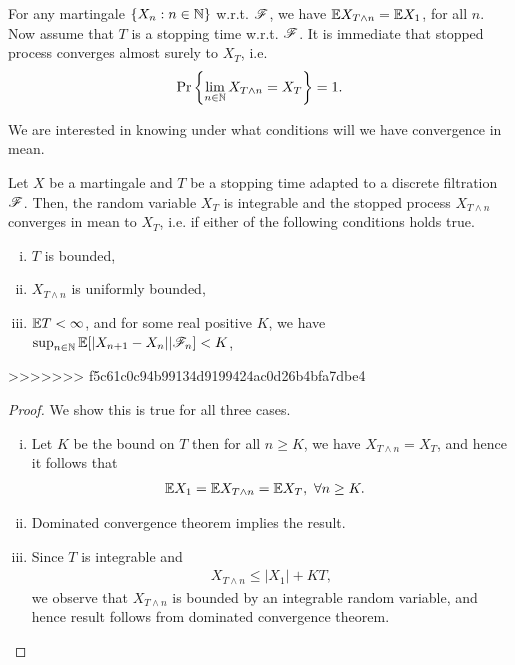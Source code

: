 \documentclass[a4paper,10pt,english]{article}
\begin{document}
\begin{thm}
\begin{rem}
For any martingale $\{X_n: n \in \mathbb{N}\}$ w.r.t. $\mathscr{F}$, we have $\mathbb{E} X_{T\wedge n} =\mathbb{E} X_1$, for all $n$.  
Now assume that $T$ is a stopping time w.r.t. $\mathscr{F}$. 
It is immediate that stopped process converges almost surely to $X_T$, i.e. 
\begin{align*}
\Pr\left\{\lim_{n\in \mathbb{N}}{X}_{T\wedge n} = X_T\right\} = 1.
\end{align*}
\end{rem}
We are interested in knowing under what conditions will we have convergence in mean. %
\begin{thm}
\label{MartStopThm}
Let $X$ be a martingale and $T$ be a stopping time adapted to a discrete filtration $\mathscr{F}$. 
Then, the random variable $X_T$ is integrable and the stopped process $X_{T \wedge n}$ converges in mean to $X_T$, i.e.
if 
either of the following conditions holds true. 
\begin{enumerate}[(i)]
\item $T$ is bounded, 
\item $X_{T\wedge n}$ is uniformly bounded,
\item $\mathbb{E} T < \infty$, and for some real positive $K$, we have $\sup_{n \in \mathbb{N}}\mathbb{E}[|X_{n+1}-X_n||\mathscr{F}_n] < K$,
\end{enumerate}
>>>>>>> f5c61c0c94b99134d9199424ac0d26b4bfa7dbe4
\end{thm}
\begin{proof} We show this is true for all three cases.
\begin{enumerate}[(i)] 
\item Let $K$ be the bound on $T$ then for all $n \geq K$, we have $X_{T\wedge n} = X_T$, and hence it follows that
\begin{align*}
\mathbb{E} X_1 = \mathbb{E} X_{T\wedge n} &= \mathbb{E} X_T, ~\forall n \geq K.
\end{align*}
\item Dominated convergence theorem implies the result. 
\item Since $T$ is integrable and  
\begin{align*} 
X_{T\wedge n} \leq |X_1| + K T,
\end{align*}
we observe that $X_{T\wedge n}$ is bounded by an integrable random variable, and hence result follows from dominated convergence theorem.
\end{enumerate}
\end{proof}


\end{thm}
\end{document}
